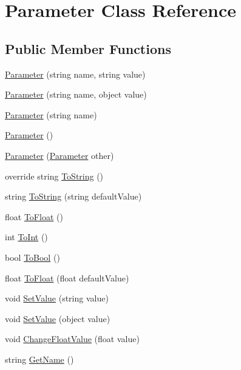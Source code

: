 \hypertarget{class_parameter}{}\section{Parameter Class Reference}
\label{class_parameter}
\subsection*{Public Member Functions}
\begin{DoxyCompactItemize}
\item 
\hyperlink{class_parameter_a4e866bc9dece89fbbc36ec7538bb8136}{Parameter} (string name, string value)
\item 
\hyperlink{class_parameter_a22400d09fa4d9e51bab72496d5d4f65f}{Parameter} (string name, object value)
\item 
\hyperlink{class_parameter_ad275dc0185cb53c2c2f34eda4052adb8}{Parameter} (string name)
\item 
\hyperlink{class_parameter_a77021d9f8462136ddac5b1bcf75af72e}{Parameter} ()
\item 
\hyperlink{class_parameter_a35b2ff8d912489cf358b4d69d39f55a0}{Parameter} (\hyperlink{class_parameter}{Parameter} other)
\item 
override string \hyperlink{class_parameter_a0f4313d453da2e93bd797289b4d5bce0}{To\+String} ()
\item 
string \hyperlink{class_parameter_ad4eab6d65a6757bf3667fc985e115098}{To\+String} (string default\+Value)
\item 
float \hyperlink{class_parameter_a79393e5f362e4be1a4f18810df271c48}{To\+Float} ()
\item 
int \hyperlink{class_parameter_ac191bcdd26956fae2fe0f0364de6cea1}{To\+Int} ()
\item 
bool \hyperlink{class_parameter_a23508701590a6baf06f7923184d7fa9b}{To\+Bool} ()
\item 
float \hyperlink{class_parameter_af9a9b45bd1524d3b70c3005548b7dbc2}{To\+Float} (float default\+Value)
\item 
void \hyperlink{class_parameter_a0330e2d85929bca7972756d18fb67a87}{Set\+Value} (string value)
\item 
void \hyperlink{class_parameter_ad37b3fd4f190efb91cda8dc79fd3078d}{Set\+Value} (object value)
\item 
void \hyperlink{class_parameter_a36bcba06d0eb673a26cf3e588707a416}{Change\+Float\+Value} (float value)
\item 
string \hyperlink{class_parameter_a8bf905caadd44b95a499ef7950805264}{Get\+Name} ()

\end{DoxyCompactItemize}

